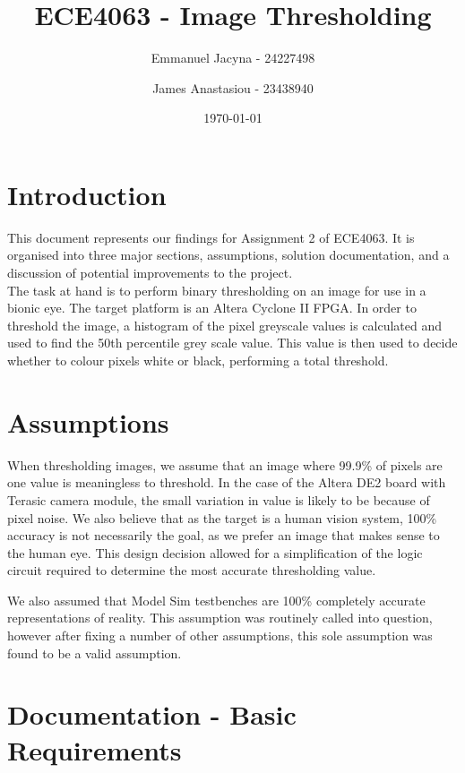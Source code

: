 \documentclass[12pt]{article}
\title{ECE4063 - Image Thresholding}
\author{Emmanuel Jacyna - 24227498 \and James Anastasiou - 23438940}
\date{\today}
\begin{document}
\pagestyle{myheadings}
  \maketitle
  \tableofcontents
  \section{Introduction}
  This document represents our findings for Assignment 2 of ECE4063. It is organised into three major sections, assumptions, solution documentation, and a discussion of potential improvements to the project.\\
  
  The task at hand is to perform binary thresholding on an image for use in a bionic eye. The target platform is an Altera Cyclone II FPGA. In order to threshold the image, a histogram of the pixel greyscale values is calculated and used to find the 50th percentile grey scale value. This value is then used to decide whether to colour pixels white or black, performing a total threshold.
  
  \section{Assumptions}
  When thresholding images, we assume that an image where 99.9\% of pixels are one value is meaningless to threshold. In the case of the Altera DE2 board with Terasic camera module, the small variation in value is likely to be because of pixel noise. We also believe that as the target is a human vision system, 100\% accuracy is not necessarily the goal, as we prefer an image that makes sense to the human eye. This design decision allowed for a simplification of the logic circuit required to determine the most accurate thresholding value. 
  
  We also assumed that Model Sim testbenches are 100\% completely accurate representations of reality. This assumption was routinely called into question, however after fixing a number of other assumptions, this sole assumption was found to be a valid assumption.
  
  \section{Documentation - Basic Requirements}
\end{document}
